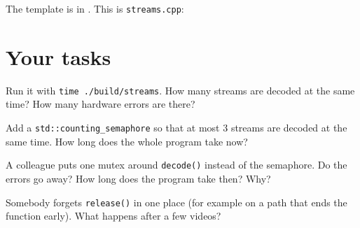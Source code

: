 The template is in . This is \texttt{streams.cpp}:


\runline

\section{Your tasks}

\begin{questions}
  \item Run it with \texttt{time ./build/streams}. How many streams are decoded at the same time?
        How many hardware errors are there?
  \item Add a \texttt{std::counting\_semaphore} so that at most 3 streams are decoded at the same time.
        How long does the whole program take now?
  \item A colleague puts one mutex around \texttt{decode()} instead of the semaphore. Do the errors go away?
        How long does the program take then? Why?
  \item Somebody forgets \texttt{release()} in one place (for example on a path that ends the function early).
        What happens after a few videos?
\end{questions}
